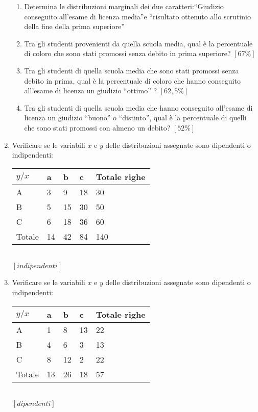 \begin{enumerate}
\begin{enumerate}
\item Determina le distribuzioni marginali dei due 
caratteri:\textquotedblleft Giudizio conseguito all'esame di licenza 
media\textquotedblright e \textquotedblleft risultato ottenuto allo 
scrutinio della fine della prima superiore\textquotedblright
\item Tra gli studenti provenienti da quella scuola media, qual è la 
percentuale di coloro che sono stati promossi senza debito in prima 
superiore? \hfill $[67\%]$
\item Tra gli studenti di quella scuola media che sono stati promossi senza 
debito in prima, qual è la percentuale di coloro che hanno conseguito 
all'esame di licenza un giudizio \textquotedblleft ottimo\textquotedblright 
? \hfill $[62,5\%]$
\item Tra gli studenti di quella scuola media che hanno conseguito 
all'esame di licenza un giudizio \textquotedblleft buono\textquotedblright 
o \textquotedblleft distinto\textquotedblright, qual è la percentuale di 
quelli che sono stati promossi con almeno un debito? \hfill $[52\%]$
\end{enumerate}
\item Verificare se le variabili $x$ e $y$ delle distribuzioni assegnate 
sono dipendenti o indipendenti:\\
\begin{tabular}{|p{1.7cm}|p{1.7cm}|p{1.7cm}|p{1.7cm}|p{1.7cm}|}
        \hline
        $y/x$ & a &     b &     c &     Totale righe\\
        \hline
        A&      3&      9&      18&30   \\
        \hline
        B&      5&      15&     30&50   \\
        \hline
        C&      6&      18      &36 &60 \\
        \hline
        Totale &14 &42 &84 &140 \\
        \hline
\end{tabular}\\
\hfill $[indipendenti]$


\item Verificare se le variabili $x$ e $y$ delle distribuzioni assegnate 
sono dipendenti o indipendenti:\\
\begin{tabular}{|p{1.7cm}|p{1.7cm}|p{1.7cm}|p{1.7cm}|p{1.7cm}|}
        \hline
        $y/x$ & a &     b &     c &     Totale righe\\
        \hline
        A&      1&      8&      13&22   \\
        \hline
        B&      4&      6&      3&13    \\
        \hline
        C&      8&      12      &2 &22 \\
        \hline
        Totale &13 &26 &18 &57 \\
        \hline
\end{tabular}\\
\hfill $[dipendenti]$



\end{enumerate}
